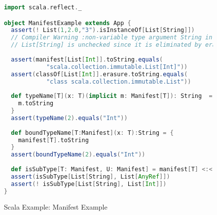 \begin{figure}[h]
\begin{lstlisting}[language=scala]
import scala.reflect._

object ManifestExample extends App {
  assert(! List(1,2.0,"3").isInstanceOf[List[String]])
  // Compiler Warning :non-variable type argument String in type 
  // List[String] is unchecked since it is eliminated by erasure
  
  assert(manifest[List[Int]].toString.equals(
            "scala.collection.immutable.List[Int]"))
  assert(classOf[List[Int]].erasure.toString.equals(
            "class scala.collection.immutable.List"))
  
  def typeName[T](x: T)(implicit m: Manifest[T]): String  = {
    m.toString
  }
  assert(typeName(2).equals("Int"))
    
  def boundTypeName[T:Manifest](x: T):String = {
    manifest[T].toString
  }
  assert(boundTypeName(2).equals("Int"))
  
  def isSubType[T: Manifest, U: Manifest] = manifest[T] <:< manifest[U]
  assert(isSubType[List[String], List[AnyRef]])
  assert(! isSubType[List[String], List[Int]]) 
}
\end{lstlisting}
\caption{Scala Example: Manifest Example}
\label{scala_manifest_example}
\end{figure}



